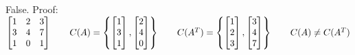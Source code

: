 \documentclass[10pt,twoside,reqno]{article}
\begin{document}
\begin{enumerate}
\begin{center}
False. Proof:
$
$$
\begin{bmatrix}
1&2&3\\
3&4&7\\
1&0&1\\
\end{bmatrix}
\hspace{7mm}
C(A) = \left\{
\begin{bmatrix}
1\\
3\\
1\\
\end{bmatrix},
\begin{bmatrix}
2\\
4\\
0\\
\end{bmatrix}
\right\}
\hspace{7mm}
C(A^T)= \left\{
\begin{bmatrix}
1\\
2\\
3\\
\end{bmatrix}, 
\begin{bmatrix}
3\\
4\\
7\\
\end{bmatrix}
\right\}
\hspace{7mm}
C(A) \neq C(A^T)
$$
$
\end{center}


\end{enumerate}
\end{document}
